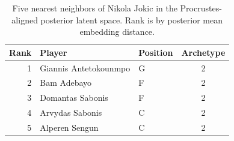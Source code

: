 \begin{table}[htbp]
  \centering\small
  \begin{tabular}{rllc}
    \toprule
    Rank & Player & Position & Archetype \\
    \midrule
    1 & Giannis Antetokounmpo & G & 2 \\
    2 & Bam Adebayo & F & 2 \\
    3 & Domantas Sabonis & F & 2 \\
    4 & Arvydas Sabonis & C & 2 \\
    5 & Alperen Sengun & C & 2 \\
    \bottomrule
  \end{tabular}
  \caption{Five nearest neighbors of Nikola Jokic in the Procrustes-aligned posterior latent space. Rank is by posterior mean embedding distance.}
\end{table}

